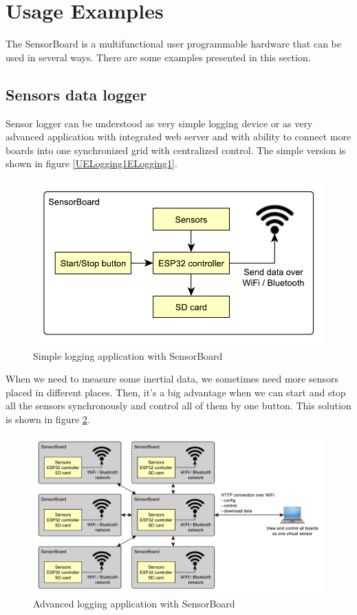 \section{Usage Examples}
The SensorBoard is a multifunctional user programmable hardware that can be used in several ways. There are some examples presented in this section.

\subsection{Sensors data logger}
\label{ExampleLogger}
Sensor logger can be understood as very simple logging device or as very advanced application with integrated web server and with ability to connect more boards into one synchronized grid with centralized control. The simple version is shown in figure \ref{UELogging1ELogging1}.

\begin{figure}[H]
	\centering
	\label{UELogging1}
	\caption{Simple logging application with SensorBoard}
	\includegraphics[scale=1]{img/UsageExamplesLogger1.pdf}
\end{figure}

When we need to measure some inertial data, we sometimes need more sensors placed in different places. Then, it's a big advantage when we can start and stop all the sensors synchronously and control all of them by one button. This solution is shown in figure \ref{UELogging2}.

\begin{figure}[H]
	\centering
	\label{UELogging2}
	\caption{Advanced logging application with SensorBoard}
	\includegraphics[width=16cm]{img/UsageExamplesLogger2.pdf}
\end{figure}

